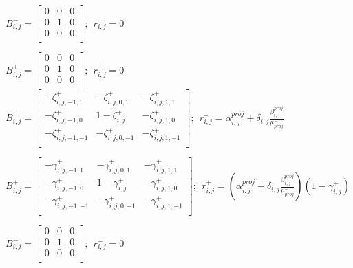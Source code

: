 \documentclass{elsarticle}
\makeatletter
\def\BState{\State\hskip-\ALG@thistlm}
\makeatother
\begin{document}
\begin{algorithm}
\begin{algorithmic}[1]
\State $B_{i,j}^-=\begin{bmatrix}
0 & 0 & 0 \\
0 & 1 & 0 \\
0 & 0 & 0 \\
\end{bmatrix};\ \ r^-_{i,j}=0$

\EndIf

\Else




\State $B_{i,j}^+=\begin{bmatrix}
0 & 0 & 0 \\
0 & 1 & 0 \\
0 & 0 & 0 \\
\end{bmatrix};\ \ r^+_{i,j}=0$
\State $B_{i,j}^-=\begin{bmatrix}
-\zeta_{i,j,-1,1}^+ & -\zeta_{i,j,0,1}^+ & -\zeta_{i,j,1,1}^+ \\
-\zeta_{i,j,-1,0}^+ & 1-\zeta^+_{i,j} & -\zeta_{i,j,1,0}^+ \\
-\zeta_{i,j,-1,-1}^+ & -\zeta_{i,j,0,-1}^+ & -\zeta_{i,j,1,-1}^+ \\
\end{bmatrix};\ \ r^-_{i,j}=\alpha_{i,j}^{proj} + \delta_{i,j}\frac{ \beta_{i,j}^{proj}}{\mu_{proj}^-}$
\Else 

\State  $B_{i,j}^+=\begin{bmatrix}
-\gamma_{i,j,-1,1}^+ & -\gamma_{i,j,0,1}^+ & -\gamma_{i,j,1,1}^+ \\
-\gamma_{i,j,-1,0}^+ & 1-\gamma^+_{i,j} & -\gamma_{i,j,1,0}^+ \\
-\gamma_{i,j,-1,-1}^+ & -\gamma_{i,j,0,-1}^+ & -\gamma_{i,j,1,-1}^+ \\
\end{bmatrix};\ \ r^+_{i,j}=(\alpha_{i,j}^{proj} + \delta_{i,j}\frac{ \beta_{i,j}^{proj}}{\mu_{proj}^-}) (1 - \gamma_{i,j}^+)$

\State $B_{i,j}^-=\begin{bmatrix}
0 & 0 & 0 \\
0 & 1 & 0 \\
0 & 0 & 0 \\
\end{bmatrix};\ \ r^-_{i,j}=0$

\EndIf


\EndIf

\EndIf

\EndProcedure
\end{algorithmic}
\end{algorithm}
\end{document}
